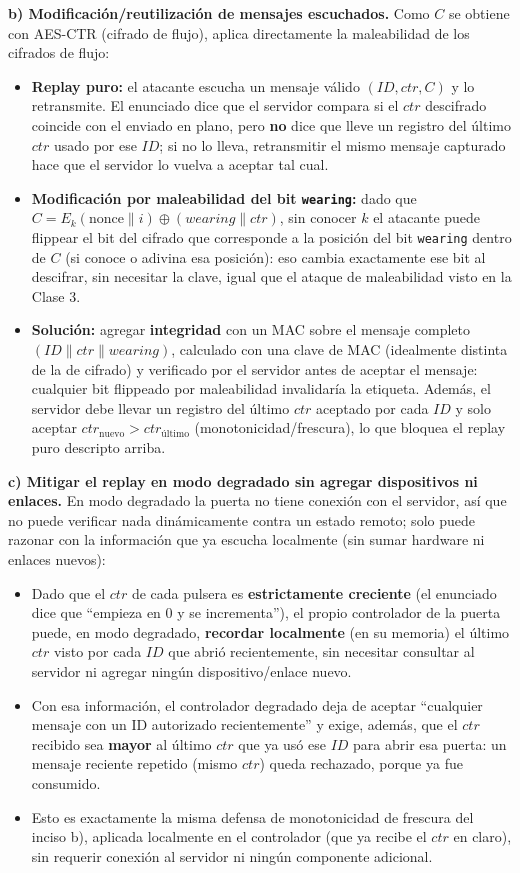 \textbf{b) Modificación/reutilización de mensajes escuchados.}
Como $C$ se obtiene con AES-CTR (cifrado de flujo), aplica directamente la
maleabilidad de los cifrados de flujo:
\begin{itemize}
  \item \textbf{Replay puro:} el atacante escucha un mensaje válido $(ID, ctr, C)$
  y lo retransmite. El enunciado dice que el servidor compara si el $ctr$
  descifrado coincide con el enviado en plano, pero \textbf{no} dice que lleve un
  registro del último $ctr$ usado por ese $ID$; si no lo lleva, retransmitir el
  mismo mensaje capturado hace que el servidor lo vuelva a aceptar tal cual.
  \item \textbf{Modificación por maleabilidad del bit \texttt{wearing}:} dado que
  $C = E_k(\text{nonce}\|i)\oplus(\mathit{wearing}\|ctr)$, sin conocer $k$ el
  atacante puede flippear el bit del cifrado que corresponde a la posición del bit
  \texttt{wearing} dentro de $C$ (si conoce o adivina esa posición): eso cambia
  exactamente ese bit al descifrar, sin necesitar la clave, igual que el ataque de
  maleabilidad visto en la Clase 3.
  \item \textbf{Solución:} agregar \textbf{integridad} con un MAC sobre el mensaje
  completo $(ID\|ctr\|\mathit{wearing})$, calculado con una clave de MAC (idealmente
  distinta de la de cifrado) y verificado por el servidor antes de aceptar el
  mensaje: cualquier bit flippeado por maleabilidad invalidaría la etiqueta. Además,
  el servidor debe llevar un registro del último $ctr$ aceptado por cada $ID$ y
  solo aceptar $ctr_{\text{nuevo}} > ctr_{\text{último}}$ (monotonicidad/frescura),
  lo que bloquea el replay puro descripto arriba.
\end{itemize}

\textbf{c) Mitigar el replay en modo degradado sin agregar dispositivos ni enlaces.}
En modo degradado la puerta no tiene conexión con el servidor, así que no puede
verificar nada dinámicamente contra un estado remoto; solo puede razonar con la
información que ya escucha localmente (sin sumar hardware ni enlaces nuevos):
\begin{itemize}
  \item Dado que el $ctr$ de cada pulsera es \textbf{estrictamente creciente} (el
  enunciado dice que ``empieza en 0 y se incrementa''), el propio controlador de la
  puerta puede, en modo degradado, \textbf{recordar localmente} (en su memoria) el
  último $ctr$ visto por cada $ID$ que abrió recientemente, sin necesitar consultar
  al servidor ni agregar ningún dispositivo/enlace nuevo.
  \item Con esa información, el controlador degradado deja de aceptar ``cualquier
  mensaje con un ID autorizado recientemente'' y exige, además, que el $ctr$
  recibido sea \textbf{mayor} al último $ctr$ que ya usó ese $ID$ para abrir esa
  puerta: un mensaje reciente repetido (mismo $ctr$) queda rechazado, porque ya fue
  consumido.
  \item Esto es exactamente la misma defensa de monotonicidad de frescura del
  inciso b), aplicada localmente en el controlador (que ya recibe el $ctr$ en
  claro), sin requerir conexión al servidor ni ningún componente adicional.
\end{itemize}

